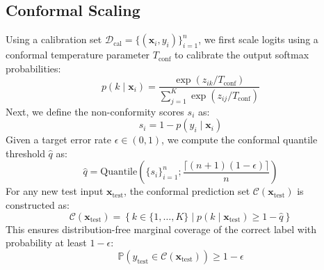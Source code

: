 \documentclass[11pt,journal,onecolumn]{IEEEtran}
\begin{document}
\subsection{Conformal Scaling}
Using a calibration set $\mathcal{D}_{\text{cal}} = \{(\mathbf{x}_i, y_i)\}_{i=1}^{n}$, we first scale logits using a conformal temperature parameter $T_{\text{conf}}$ to calibrate the output softmax probabilities:
\begin{equation}
    p(k \mid \mathbf{x}_i) = \frac{\exp(z_{ik} / T_{\text{conf}})}{\sum_{j=1}^K \exp(z_{ij} / T_{\text{conf}})}
\end{equation}
Next, we define the non-conformity scores $s_i$ as:
\begin{equation}
    s_i = 1 - p(y_i \mid \mathbf{x}_i)
\end{equation}
Given a target error rate $\epsilon \in (0, 1)$, we compute the conformal quantile threshold $\hat{q}$ as:
\begin{equation}
    \hat{q} = \text{Quantile}\left( \{s_i\}_{i=1}^n; \frac{\lceil (n+1)(1-\epsilon) \rceil}{n} \right)
\end{equation}
For any new test input $\mathbf{x}_{\text{test}}$, the conformal prediction set $\mathcal{C}(\mathbf{x}_{\text{test}})$ is constructed as:
\begin{equation}
    \mathcal{C}(\mathbf{x}_{\text{test}}) = \left\{ k \in \{1, \dots, K\} \mid p(k \mid \mathbf{x}_{\text{test}}) \ge 1 - \hat{q} \right\}
\end{equation}
This ensures distribution-free marginal coverage of the correct label with probability at least $1-\epsilon$:
\begin{equation}
    \mathbb{P}\left( y_{\text{test}} \in \mathcal{C}(\mathbf{x}_{\text{test}}) \right) \ge 1 - \epsilon
\end{equation}
\end{document}
